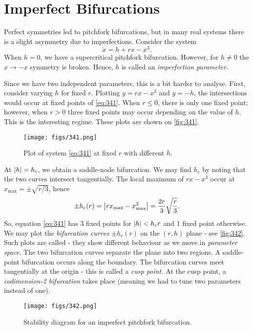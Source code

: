 \documentclass[oneside]{book}
\begin{document}
\section{Imperfect Bifurcations}
Perfect symmetries led to pitchfork bifurcations, but in many real systems there is a slight asymmetry due to imperfections. Consider the system
\begin{equation} \label{eq:341}
	\dot{x} = h + rx - x^3.
\end{equation}
When $ h = 0 $, we have a supercritical pitchfork bifurcation. However, for $ h \neq 0 $ the $ x \to -x $ symmetry is broken. Hence, $ h $ is called an \textit{imperfection parameter.}
\par
Since we have two independent parameters, this is a bit harder to analyse. First, consider varying $ h $ for fixed $ r $. Plotting $ y = rx - x^3 $ and $ y = -h $, the intersections would occur at fixed points of \eqref{eq:341}. When $ r \leq 0 $, there is only one fixed point; however, when $ r > 0 $ three fixed points may occur depending on the value of $ h $. This is the interesting regime. These plots are shown on \autoref{fig:341}.
\begin{figure}[h]
	\centering
	\texttt{[image: figs/341.png]}
	\caption{Plot of system \eqref{eq:341} at fixed $ r $ with different $ h $.}
	\label{fig:341}
\end{figure}
\par
At $ \abs{h} = h_c $, we obtain a saddle-node bifurcation. We may find $ h_c $ by noting that the two curves intersect tangentially. The local maximum of $ rx - x^3 $ occur at $ x_\text{max} = \pm \sqrt{r/3} $, hence
\[
\pm h_c (r) = \abs{r x_{\text{max}} - x_\text{max}^3} = \frac{2r}{3}\sqrt{\frac{r}{3}}.
\]
So, equation \eqref{eq:341} has 3 fixed points for $ \abs{h} < h_c{r} $ and 1 fixed point otherwise. We may plot the \textit{bifurcation curves} $ \pm h_c(r) $ on the $ (r, h) $ plane - see \autoref{fig:342}. Such plots are called  - they show different behaviour as we move in \textit{parameter space}. The two bifurcation curves separate the plane into two regions. A saddle-point bifurcation occurs along the boundary. The bifurcation curves meet tangentially at the origin - this is called a \textit{cusp point.} At the cusp point, a \textit{codimension-2 bifurcation} takes place (meaning we had to tune two parameters instead of one).
\begin{figure}[h]
	\centering
	\texttt{[image: figs/342.png]}
	\caption{Stability diagram for an imperfect pitchfork bifurcation.}
	\label{fig:342}
\end{figure}
\end{document}
